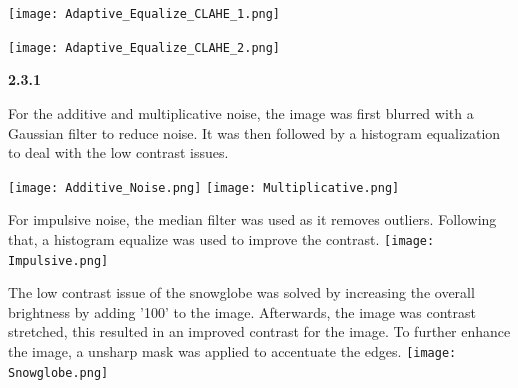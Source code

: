 \documentclass[
]{article}
\begin{document}
\texttt{[image: Adaptive\_Equalize\_CLAHE\_1.png]}

\texttt{[image: Adaptive\_Equalize\_CLAHE\_2.png]}

\pagebreak
\textbf{2.3.1}

For the additive and multiplicative noise, the image was first blurred with a Gaussian filter to reduce noise. It was then followed by a histogram equalization to deal with the low contrast issues. 


\texttt{[image: Additive\_Noise.png]}
\texttt{[image: Multiplicative.png]}


For impulsive noise, the median filter was used as it removes outliers. Following that, a histogram equalize was used to improve the contrast.
\texttt{[image: Impulsive.png]}

\pagebreak\pagebreak
The low contrast issue of the snowglobe was solved by increasing the overall brightness by adding '100' to the image. Afterwards, the image was contrast stretched, this resulted in an improved contrast for the image. To further enhance the image, a unsharp mask was applied to accentuate the edges.
\texttt{[image: Snowglobe.png]}

\pagebreak
\end{document}
